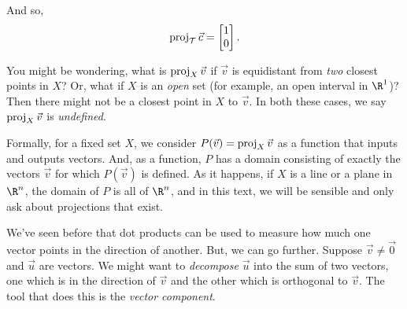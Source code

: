 \begin{example}
\begin{center}
\end{center}

	And so, 
	\[
		\Proj_{\mathcal T}\vec c =\mat{1\\0}.
	\]
\end{example}

You might be wondering, what is $\operatorname{proj}_X\vec v$ if $\vec v$ is equidistant from \emph{two}
closest points in $X$? Or, what if $X$ is an \emph{open} set (for example, an open interval in $\R^1$)?
Then there might not be a closest point in $X$ to $\vec v$. In both these cases, we say $\operatorname{proj}_X\vec v$
is \emph{undefined}.

Formally, for a fixed set $X$, we consider $P(\vec v)=\operatorname{proj}_X\vec v$ as a function that inputs and outputs
vectors. And, as a function, $P$ has a domain consisting of exactly the vectors $\vec v$ for which $P(\vec v)$
is defined. As it happens, if $X$ is a line or a plane in $\R^n$, the domain of $P$ is all of $\R^n$, and in this text,
we will be sensible and only ask about projections that exist. 


We've seen before that dot products can be used to measure how much one
vector points in the direction of another. But, we can go further. Suppose 
$\vec v\neq \vec 0$ and $\vec u$ are vectors. We might want to \emph{decompose}
$\vec u$ into the sum of two vectors, one which is in the direction of $\vec v$
and the other which is orthogonal to $\vec v$. The tool that does this is the \emph{vector component}.


